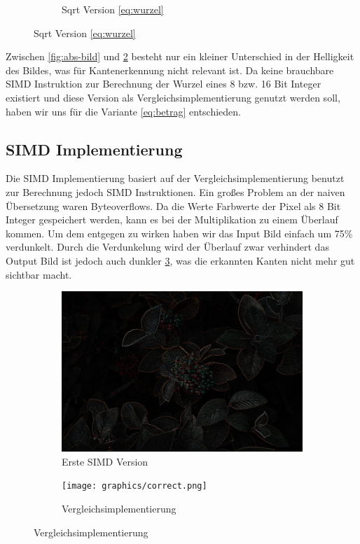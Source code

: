 \documentclass[course=erap]{aspdoc}
\begin{document}
\begin{figure}[H]
\begin{subfigure}{.5\columnwidth}
        \caption{Sqrt Version \ref{eq:wurzel}}
        \label{fig:sqrt-bild}
    \end{subfigure}
\end{figure}
Zwischen {\ref{fig:abs-bild}} und {\ref{fig:sqrt-bild}} besteht nur ein kleiner Unterschied in der Helligkeit des Bildes, was für Kantenerkennung nicht relevant ist.
Da keine brauchbare SIMD Instruktion zur Berechnung der Wurzel eines 8 bzw. 16 Bit Integer existiert und diese Version als Vergleichsimplementierung genutzt werden soll, haben wir uns für die Variante {\ref{eq:betrag}} entschieden.
\subsection{SIMD Implementierung}
Die SIMD Implementierung basiert auf der Vergleichsimplementierung benutzt zur Berechnung jedoch SIMD Instruktionen.
Ein großes Problem an der naiven Übersetzung waren Byteoverflows.
Da die Werte Farbwerte der Pixel als 8 Bit Integer gespeichert werden, kann es bei der Multiplikation zu einem Überlauf kommen.
Um dem entgegen zu wirken haben wir das Input Bild einfach um 75\% verdunkelt.
Durch die Verdunkelung wird der Überlauf zwar verhindert das Output Bild ist jedoch auch dunkler {\ref{fig:dark}}, was die erkannten Kanten nicht mehr gut sichtbar macht.
\begin{figure}[H]
    \begin{subfigure}{.5\columnwidth}
        \centering
        \includegraphics[width=\columnwidth]{graphics/dark.png}
        \caption{Erste SIMD Version}
        \label{fig:dark}
    \end{subfigure}
    \begin{subfigure}{.5\columnwidth}
        \centering
        \texttt{[image: graphics/correct.png]}
        \caption{Vergleichsimplementierung}
        \label{fig:correct}
    \end{subfigure}
\end{figure}
\end{document}
